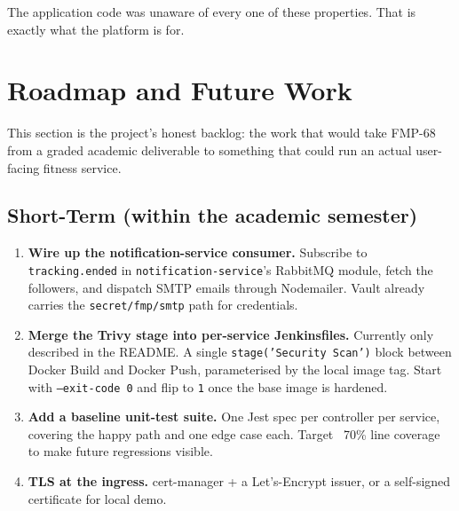 \documentclass[11pt,a4paper]{article}
\begin{document}
The application code was unaware of every one of these properties.
That is exactly what the platform is for.

\section{Roadmap and Future Work}

This section is the project's honest backlog: the work that would
take FMP-68 from a graded academic deliverable to something that
could run an actual user-facing fitness service.

\subsection{Short-Term (within the academic semester)}
\begin{enumerate}[leftmargin=*]
  \item \textbf{Wire up the notification-service consumer.}
        Subscribe to \texttt{tracking.ended} in
        \texttt{notification-service}'s RabbitMQ module, fetch the
        followers, and dispatch SMTP emails through Nodemailer.
        Vault already carries the \texttt{secret/fmp/smtp} path
        for credentials.
  \item \textbf{Merge the Trivy stage into per-service Jenkinsfiles.}
        Currently only described in the README.  A single
        \texttt{stage('Security Scan')} block between Docker Build
        and Docker Push, parameterised by the local image tag.
        Start with \texttt{--exit-code 0} and flip to \texttt{1}
        once the base image is hardened.
  \item \textbf{Add a baseline unit-test suite.}  One Jest spec per
        controller per service, covering the happy path and one
        edge case each.  Target ~70\% line coverage to make
        future regressions visible.
  \item \textbf{TLS at the ingress.}  cert-manager + a
        Let's-Encrypt issuer, or a self-signed certificate for
        local demo.
\end{enumerate}
\end{document}
